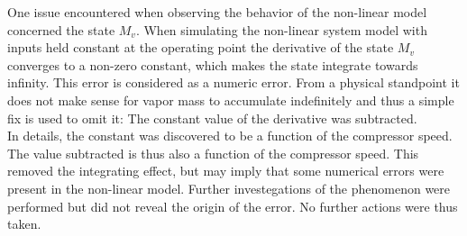 One issue encountered when observing the behavior of the non-linear model concerned the state $M_v$. When simulating the non-linear system model with inputs held constant at the operating point the derivative of the state $M_v$ converges to a non-zero constant, which makes the state integrate towards infinity. This error is considered as a numeric error. From a physical standpoint it does not make sense for vapor mass to accumulate indefinitely and thus a simple fix is used to omit it: The constant value of the derivative was subtracted. \\

In details, the constant was discovered to be a function of the compressor speed. The value subtracted is thus also a function of the compressor speed. This removed the integrating effect, but may imply that some numerical errors were present in the non-linear model. Further investegations of the phenomenon were performed but did not reveal the origin of the error. No further actions were thus taken.




